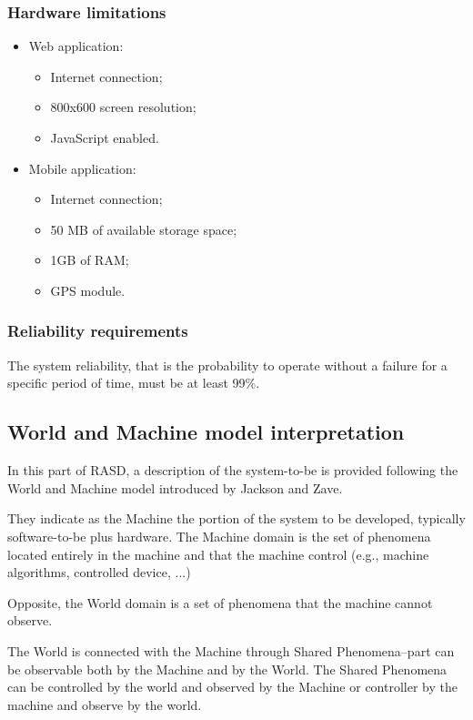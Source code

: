 \documentclass{article}
\begin{document}
	\subsubsection{Hardware limitations}
	\begin{itemize}
		\item Web application:
			\begin{itemize}
				\item Internet connection;
				\item 800x600 screen resolution;
				\item JavaScript enabled.
			\end{itemize}
		\item Mobile application:
			\begin{itemize}
				\item Internet connection;
				\item 50 MB of available storage space;
				\item 1GB of RAM;
				\item GPS module.
			\end{itemize}
	\end{itemize}
	
	
	\subsubsection{Reliability requirements}
	The system reliability, that is the probability to operate without a failure for a specific period of time, must be at least 99\%.
	
	
	\subsection{World and Machine model interpretation}
	In this part of RASD, a description of the system-to-be is provided following the World and Machine model introduced by Jackson and Zave.
	
	\bigskip
	They indicate as the Machine the portion of the system to be developed, typically software-to-be plus hardware. The Machine domain is the set of phenomena located entirely in the machine and that the machine control (e.g., machine algorithms, controlled device, ...)
	
	\bigskip
	Opposite, the World domain is a set of phenomena that the machine cannot observe.

	\bigskip
	The World is connected with the Machine through Shared Phenomena--part can be observable both by the Machine and by the World. The Shared Phenomena can be controlled by the world and observed by the Machine or controller by the machine and observe by the world.
	
\end{document}
